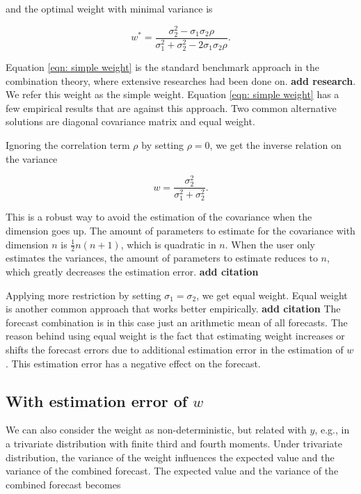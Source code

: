 \documentclass[11pt]{article}
\begin{document}
and the optimal weight with minimal variance is

\begin{equation}
\label{eqn: simple weight}
w^*=\frac{\sigma_2^2-\sigma_1\sigma_2\rho}{\sigma_1^2+\sigma_2^2 -2\sigma_1\sigma_2\rho}.
\end{equation}

Equation \ref{eqn: simple weight} is the standard benchmark approach in
the combination theory, where extensive researches had been done on. 
\textbf{add research}. We refer this weight as the simple weight. Equation \ref{eqn: simple weight} has a few
empirical results that are against this approach. Two common
alternative solutions are diagonal covariance matrix and equal weight.

Ignoring the correlation term \(\rho\) by setting \(\rho=0\), we get the
inverse relation on the variance

\begin{equation}
\label{eqn: simple weight no corr}
w=\frac{\sigma_2^2}{\sigma_1^2+\sigma_2^2}.
\end{equation}

This is a robust way to avoid the estimation of the covariance when the
dimension goes up. The amount of parameters to estimate for the
covariance with dimension \(n\) is \(\frac{1}{2}n(n+1)\), which is
quadratic in \(n\). When the user only estimates the variances, the
amount of parameters to estimate reduces to \(n\), which greatly
decreases the estimation error. \textbf{add citation}

Applying more restriction by setting $\sigma_1=\sigma_2$, we get equal weight. Equal weight is another common approach that works better empirically.
\textbf{add citation} The forecast combination is in this case just an
arithmetic mean of all forecasts. The reason behind using equal weight is the fact
that estimating weight increases or shifts the forecast errors due to
additional estimation error in the estimation of \(w\). This estimation error has a negative effect on the forecast.


\subsection{\texorpdfstring{With estimation error of
\(w\)}{With estimation error of w}}\label{with-estimation-error-of-w}

We can also consider the weight as non-deterministic, but related with
\(y\), e.g., in a trivariate distribution with finite third and fourth
moments. Under trivariate distribution, the variance of the weight
influences the expected value and the variance of the combined forecast.
The expected value and the variance of the combined forecast becomes
\end{document}
